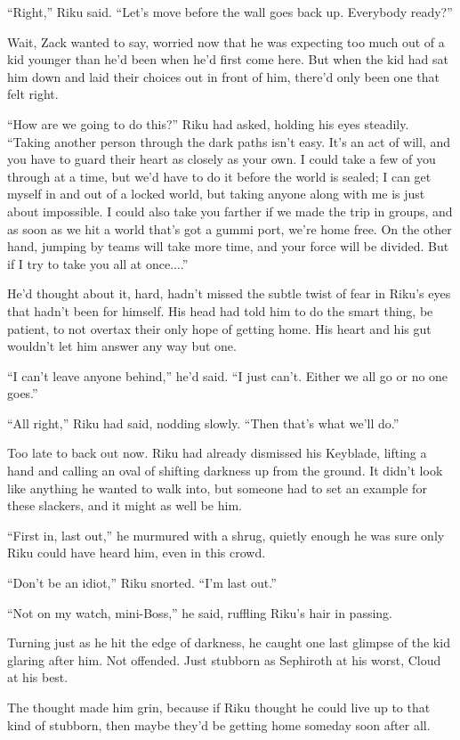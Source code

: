 ``Right,'' Riku said. ``Let's move before the wall goes back up. Everybody ready?''

Wait, Zack wanted to say, worried now that he was expecting too much out of a kid younger than he'd been when he'd first come here. But when the kid had sat him down and laid their choices out in front of him, there'd only been one that felt right.

``How are we going to do this?'' Riku had asked, holding his eyes steadily. ``Taking another person through the dark paths isn't easy. It's an act of will, and you have to guard their heart as closely as your own. I could take a few of you through at a time, but we'd have to do it before the world is sealed; I can get myself in and out of a locked world, but taking anyone along with me is just about impossible. I could also take you farther if we made the trip in groups, and as soon as we hit a world that's got a gummi port, we're home free. On the other hand, jumping by teams will take more time, and your force will be divided. But if I try to take you all at once....''

He'd thought about it, hard, hadn't missed the subtle twist of fear in Riku's eyes that hadn't been for himself. His head had told him to do the smart thing, be patient, to not overtax their only hope of getting home. His heart and his gut wouldn't let him answer any way but one.

``I can't leave anyone behind,'' he'd said. ``I just can't. Either we all go or no one goes.''

``All right,'' Riku had said, nodding slowly. ``Then that's what we'll do.''

Too late to back out now. Riku had already dismissed his Keyblade, lifting a hand and calling an oval of shifting darkness up from the ground. It didn't look like anything he wanted to walk into, but someone had to set an example for these slackers, and it might as well be him.

``First in, last out,'' he murmured with a shrug, quietly enough he was sure only Riku could have heard him, even in this crowd.

``Don't be an idiot,'' Riku snorted. ``I'm last out.''

``Not on my watch, mini-Boss,'' he said, ruffling Riku's hair in passing.

Turning just as he hit the edge of darkness, he caught one last glimpse of the kid glaring after him. Not offended. Just stubborn as Sephiroth at his worst, Cloud at his best.

The thought made him grin, because if Riku thought he could live up to that kind of stubborn, then maybe they'd be getting home someday soon after all.
